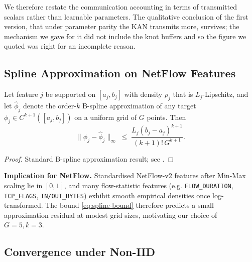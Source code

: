 We therefore restate the communication accounting in terms of transmitted scalars rather than
learnable parameters. The qualitative conclusion of the first version, that under parameter
parity the KAN transmits more, survives; the mechanism we gave for it did not include the knot
buffers and so the figure we quoted was right for an incomplete reason.

\subsection{Spline Approximation on NetFlow Features}

\begin{lemma}\label{lem:spline}
Let feature $j$ be supported on $[a_j, b_j]$ with density $\rho_j$ that is $L_j$-Lipschitz, and let $\hat\phi_j$ denote the order-$k$ B-spline approximation of any target $\phi_j \in C^{k+1}([a_j, b_j])$ on a uniform grid of $G$ points. Then
\begin{equation}\label{eq:spline-bound}
\|\phi_j - \hat\phi_j\|_\infty \;\leq\; \frac{L_j (b_j - a_j)^{k+1}}{(k+1)!\, G^{k+1}}.
\end{equation}
\end{lemma}

\begin{proof}
Standard B-spline approximation result; see \cite[Theorem 6.27]{schumaker2007}.
\end{proof}

\textbf{Implication for NetFlow.} Standardised NetFlow-v2 features \cite{sarhan2022standard} after Min-Max scaling lie in $[0, 1]$, and many flow-statistic features (e.g. \texttt{FLOW\_DURATION}, \texttt{TCP\_FLAGS}, \texttt{IN/OUT\_BYTES}) exhibit smooth empirical densities once log-transformed. The bound \eqref{eq:spline-bound} therefore predicts a small approximation residual at modest grid sizes, motivating our choice of $G=5, k=3$.

\subsection{Convergence under Non-IID}

